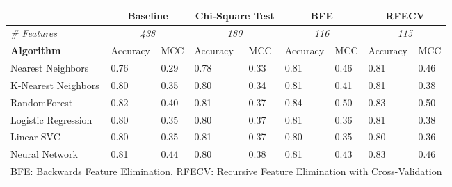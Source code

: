 \begin{tabular}{l|ll|ll|ll|ll}
& \multicolumn{2}{c|}{\textbf{Baseline}} & \multicolumn{2}{c|}{\textbf{Chi-Square Test}}  & \multicolumn{2}{c|}{\textbf{BFE}} & \multicolumn{2}{c}{\textbf{RFECV}} \\
\toprule
\textit{\# Features}& \multicolumn{2}{c|}{\textit{438}} & \multicolumn{2}{c|}{\textit{180}}  & \multicolumn{2}{c|}{\textit{116}} & \multicolumn{2}{c}{\textit{115}} \\
\midrule
\textbf{Algorithm}      & Accuracy  & MCC   & Accuracy  & MCC   & Accuracy  & MCC   & Accuracy  & MCC \\
\midrule                       
Nearest Neighbors       & 0.76      & 0.29  & 0.78      & 0.33  & 0.81      & 0.46  & 0.81      & 0.46 \\
K-Nearest Neighbors     & 0.80      & 0.35  & 0.80      & 0.34  & 0.81      & 0.41  & 0.81      & 0.38 \\
RandomForest            & 0.82      & 0.40  & 0.81      & 0.37  & 0.84      & 0.50  & 0.83      & 0.50 \\
Logistic Regression     & 0.80      & 0.35  & 0.80      & 0.37  & 0.81      & 0.36  & 0.81      & 0.38 \\
Linear SVC              & 0.80      & 0.35  & 0.81      & 0.37  & 0.80      & 0.35  & 0.80      & 0.36 \\
Neural Network          & 0.81      & 0.44  & 0.80      & 0.38  & 0.81      & 0.43  & 0.83      & 0.46 \\
\bottomrule
\multicolumn{9}{l}{\tiny{BFE: Backwards Feature Elimination, RFECV: Recursive Feature Elimination with Cross-Validation}}
\end{tabular}

